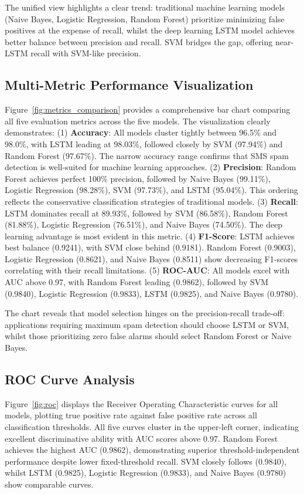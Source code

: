 \documentclass[a4paper,
               ]{jacow}
\begin{document}
The unified view highlights a clear trend: traditional machine learning models (Naive Bayes, Logistic Regression, Random Forest) prioritize minimizing false positives at the expense of recall, whilst the deep learning LSTM model achieves better balance between precision and recall. SVM bridges the gap, offering near-LSTM recall with SVM-like precision.

\subsection{Multi-Metric Performance Visualization}

Figure~\ref{fig:metrics_comparison} provides a comprehensive bar chart comparing all five evaluation metrics across the five models. The visualization clearly demonstrates: (1) \textbf{Accuracy}: All models cluster tightly between 96.5\% and 98.0\%, with LSTM leading at 98.03\%, followed closely by SVM (97.94\%) and Random Forest (97.67\%). The narrow accuracy range confirms that SMS spam detection is well-suited for machine learning approaches. (2) \textbf{Precision}: Random Forest achieves perfect 100\% precision, followed by Naive Bayes (99.11\%), Logistic Regression (98.28\%), SVM (97.73\%), and LSTM (95.04\%). This ordering reflects the conservative classification strategies of traditional models. (3) \textbf{Recall}: LSTM dominates recall at 89.93\%, followed by SVM (86.58\%), Random Forest (81.88\%), Logistic Regression (76.51\%), and Naive Bayes (74.50\%). The deep learning advantage is most evident in this metric. (4) \textbf{F1-Score}: LSTM achieves best balance (0.9241), with SVM close behind (0.9181). Random Forest (0.9003), Logistic Regression (0.8621), and Naive Bayes (0.8511) show decreasing F1-scores correlating with their recall limitations. (5) \textbf{ROC-AUC}: All models excel with AUC above 0.97, with Random Forest leading (0.9862), followed by SVM (0.9840), Logistic Regression (0.9833), LSTM (0.9825), and Naive Bayes (0.9780).

The chart reveals that model selection hinges on the precision-recall trade-off: applications requiring maximum spam detection should choose LSTM or SVM, whilst those prioritizing zero false alarms should select Random Forest or Naive Bayes.

\subsection{ROC Curve Analysis}

Figure~\ref{fig:roc} displays the Receiver Operating Characteristic curves for all models, plotting true positive rate against false positive rate across all classification thresholds. All five curves cluster in the upper-left corner, indicating excellent discriminative ability with AUC scores above 0.97. Random Forest achieves the highest AUC (0.9862), demonstrating superior threshold-independent performance despite lower fixed-threshold recall. SVM closely follows (0.9840), whilst LSTM (0.9825), Logistic Regression (0.9833), and Naive Bayes (0.9780) show comparable curves.
\end{document}
